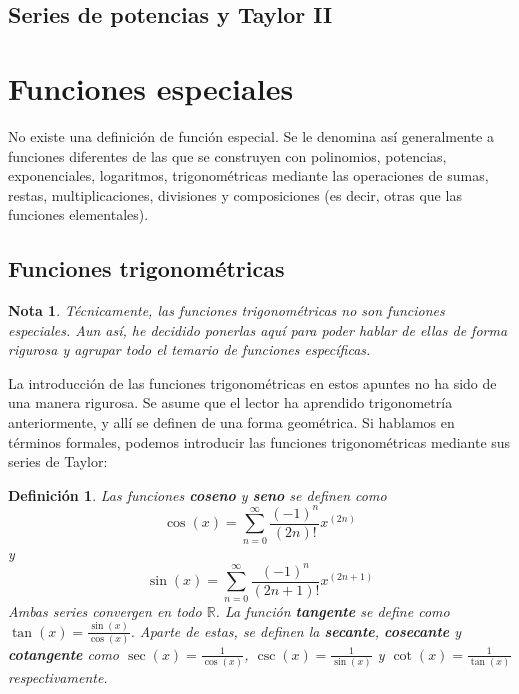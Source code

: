 \documentclass{article}
\newtheorem{define}{Definición}
\newtheorem{note}{Nota}
\newcommand{\reales}{\mathbb{R}}
\begin{document}
\subsection{Series de potencias y Taylor II}


\newpage
\section{Funciones especiales}
No existe una definición de función especial. Se le denomina así generalmente a funciones diferentes de las que se construyen con polinomios, potencias, exponenciales, logaritmos, trigonométricas mediante las operaciones de sumas, restas, multiplicaciones, divisiones y composiciones (es decir, otras que las funciones elementales).


\subsection{Funciones trigonométricas}
\begin{note}
	Técnicamente, las funciones trigonométricas no son funciones especiales. Aun así, he decidido ponerlas aquí para poder hablar de ellas de forma rigurosa y agrupar todo el temario de funciones específicas.
\end{note}
La introducción de las funciones trigonométricas en estos apuntes no ha sido de una manera rigurosa. Se asume que el lector ha aprendido trigonometría anteriormente, y allí se definen de una forma geométrica. Si hablamos en términos formales, podemos introducir las funciones trigonométricas mediante sus series de Taylor:

\begin{define}
	Las funciones \textbf{coseno} y \textbf{seno} se definen como
	\begin{equation*}
		\cos(x) = \sum_{n=0}^{\infty} \frac{(-1)^n}{(2n)!} x^{(2n)}
	\end{equation*}
	y
	\begin{equation*}
		\sin(x) = \sum_{n=0}^{\infty} \frac{(-1)^n}{(2n+1)!} x^{(2n+1)}
	\end{equation*}
	Ambas series convergen en todo $\reales$.
	La función \textbf{tangente} se define como $\tan(x) = \frac{\sin(x)}{\cos(x)}$.
	Aparte de estas, se definen la \textbf{secante}, \textbf{cosecante} y \textbf{cotangente} como $\sec(x) = \frac{1}{\cos(x)}$, $\csc(x) = \frac{1}{\sin(x)}$ y $\cot(x) = \frac{1}{\tan(x)}$ respectivamente.
\end{define}
\end{document}
